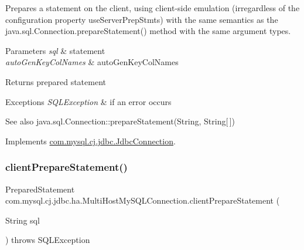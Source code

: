 Prepares a statement on the client, using client-\/side emulation (irregardless of the configuration property \textquotesingle{}use\+Server\+Prep\+Stmts\textquotesingle{}) with the same semantics as the java.\+sql.\+Connection.\+prepare\+Statement() method with the same argument types.


\begin{DoxyParams}{Parameters}
{\em sql} & statement \\
\hline
{\em auto\+Gen\+Key\+Col\+Names} & auto\+Gen\+Key\+Col\+Names \\
\hline
\end{DoxyParams}
\begin{DoxyReturn}{Returns}
prepared statement 
\end{DoxyReturn}

\begin{DoxyExceptions}{Exceptions}
{\em S\+Q\+L\+Exception} & if an error occurs\\
\hline
\end{DoxyExceptions}
\begin{DoxySeeAlso}{See also}
java.\+sql.\+Connection\+::prepare\+Statement(\+String, String\mbox{[}$\,$\mbox{]}) 
\end{DoxySeeAlso}


Implements \mbox{\hyperlink{interfacecom_1_1mysql_1_1cj_1_1jdbc_1_1_jdbc_connection_a46a218367bb0a386a18caed711142d7a}{com.\+mysql.\+cj.\+jdbc.\+Jdbc\+Connection}}.

\mbox{\label{classcom_1_1mysql_1_1cj_1_1jdbc_1_1ha_1_1_multi_host_my_s_q_l_connection_aad5b9594841a4c935130b225d0c3d686}} 
\subsubsection{\texorpdfstring{client\+Prepare\+Statement()}{clientPrepareStatement()}\hspace{0.1cm}{\footnotesize\ttfamily [6/6]}}
{\footnotesize\ttfamily Prepared\+Statement com.\+mysql.\+cj.\+jdbc.\+ha.\+Multi\+Host\+My\+S\+Q\+L\+Connection.\+client\+Prepare\+Statement (\begin{DoxyParamCaption}\item[{String}]{sql }\end{DoxyParamCaption}) throws S\+Q\+L\+Exception}


